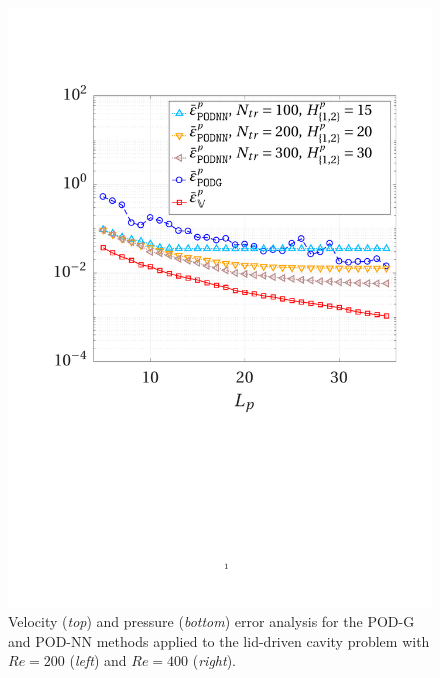 \documentclass[longtitle]{elsarticle}
\numberwithin{equation}{section}
\theoremstyle{theorem}
\theoremstyle{definition}
\theoremstyle{remark}
\theoremstyle{proposition}
\numberwithin{figure}{section}
\begin{document}
\begin{figure}[t!]
			\includegraphics[scale = 0.37, trim = {2cm 9cm 1.5cm 3.5cm}, clip]{dc_400_p_error_vs_rank}
			
			\vspace*{-0.3cm}

			\caption{Velocity (\textcolor{deepgreen}{\emph{top}}) and pressure (\textcolor{deepgreen}{\emph{bottom}}) error analysis for the POD-G and POD-NN methods applied to the lid-driven cavity problem with $Re = 200$ (\textcolor{deepgreen}{\emph{left}}) and $Re = 400$ (\textcolor{deepgreen}{\emph{right}}).}
			\label{fig:dc-error-vs-rank}
		\end{figure}
\end{document}
